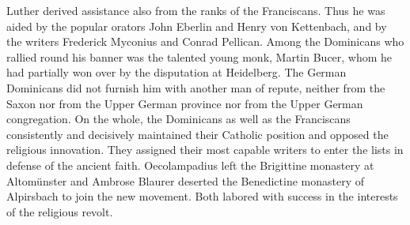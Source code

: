 Luther derived assistance also from the ranks of the Franciscans.
Thus he was aided by the popular orators John Eberlin and Henry
von Kettenbach, and by the writers Frederick Myconius and Conrad
Pellican. Among the Dominicans who rallied round his banner was
the talented young monk, Martin Bucer, whom he had partially
won over by the disputation at Heidelberg. The German Dominicans
did not furnish him with another man of repute, neither from the
Saxon nor from the Upper German province nor from the Upper
German congregation. On the whole, the Dominicans as well as the
Franciscans consistently and decisively maintained their Catholic position
and opposed the religious innovation. They assigned their most
capable writers to enter the lists in defense of the ancient faith.
Oecolampadius left the Brigittine monastery at Altomünster and
Ambrose Blaurer deserted the Benedictine monastery of Alpirsbach to
join the new movement. Both labored with success in the interests of
the religious revolt.

